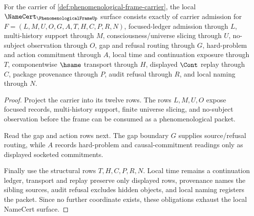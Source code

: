 \begin{theorem}
\label{thm:phenomenological-frame-namecert-obligations}
For the carrier of \autoref{def:phenomenological-frame-carrier}, the local $\NameCert_{\PhenomenologicalFrameUp}$ surface consists exactly of carrier admission for $F=(L,M,U,O,G,A,T,H,C,P,R,N)$, focused-ledger admission through $L$, multi-history support through $M$, consciousness/universe slicing through $U$, no-subject observation through $O$, gap and refusal routing through $G$, hard-problem and action commitment through $A$, local time and continuation exposure through $T$, componentwise $\hsame$ transport through $H$, displayed $\Cont$ replay through $C$, package provenance through $P$, audit refusal through $R$, and local naming through $N$.
\end{theorem}
\begin{proof}
Project the carrier into its twelve rows. The rows $L,M,U,O$ expose focused records, multi-history support, finite universe slicing, and no-subject observation before the frame can be consumed as a phenomenological packet.

Read the gap and action rows next. The gap boundary $G$ supplies source/refusal routing, while $A$ records hard-problem and causal-commitment readings only as displayed socketed commitments.

Finally use the structural rows $T,H,C,P,R,N$. Local time remains a continuation ledger, transport and replay preserve only displayed rows, provenance names the sibling sources, audit refusal excludes hidden objects, and local naming registers the packet. Since no further coordinate exists, these obligations exhaust the local NameCert surface.
\end{proof}

